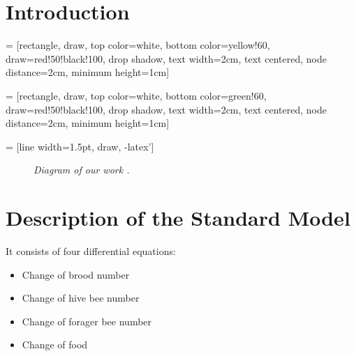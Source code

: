 \documentclass[
paper=128mm:96mm, %
fontsize=11pt, %
pagesize, %
parskip=half-, %
]{scrartcl} %
\theoremstyle{mythmstyle} %
\begin{document}
\clearpage


\section{Introduction}

 = [rectangle, draw, top color=white, bottom color=yellow!60, draw=red!50!black!100, drop shadow, text width=2cm, text centered, node distance=2cm, minimum height=1cm]

 = [rectangle, draw, top color=white, bottom color=green!60, draw=red!50!black!100, drop shadow, text width=2cm, text centered, node distance=2cm, minimum height=1cm]

 = [line width=1.5pt, draw, -latex']

\begin{figure}[h]
	\centering

\caption{\textit{Diagram of our work \cite{khoury13} \cite{seeley95}.}}
	\label{fig:workDiagram}
\end{figure}


\clearpage

\section{Description of the Standard Model}
It consists of four differential equations:
\begin{itemize}
	\item Change of brood number
	\item Change of hive bee number
	\item Change of forager bee number
	\item Change of food
\end{itemize}
\end{document}
